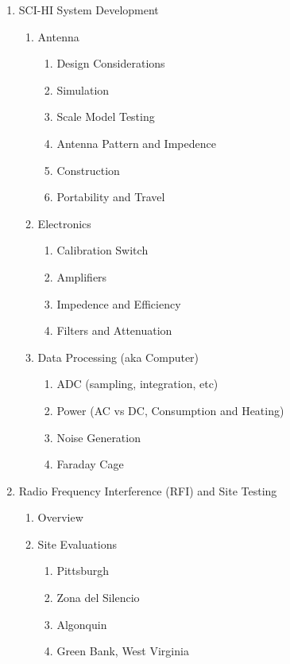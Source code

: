 \documentclass[12pt,twoside]{report}
\begin{document}
\begin{enumerate}
\item SCI-HI System Development

\begin{enumerate}
\item Antenna

\begin{enumerate}
\item Design Considerations
\item Simulation
\item Scale Model Testing
\item Antenna Pattern and Impedence
\item Construction
\item Portability and Travel
\end{enumerate}

\item Electronics

\begin{enumerate}
\item Calibration Switch
\item Amplifiers
\item Impedence and Efficiency
\item Filters and Attenuation
\end{enumerate}

\item Data Processing (aka Computer)

\begin{enumerate}
\item ADC (sampling, integration, etc)
\item Power (AC vs DC, Consumption and Heating)
\item Noise Generation
\item Faraday Cage
\end{enumerate}

\end{enumerate}


\item Radio Frequency Interference (RFI) and Site Testing

\begin{enumerate}
\item Overview
\item Site Evaluations

\begin{enumerate}
\item Pittsburgh
\item Zona del Silencio
\item Algonquin 
\item Green Bank, West Virginia
\end{enumerate}


\end{enumerate}
\end{enumerate}
\end{document}
